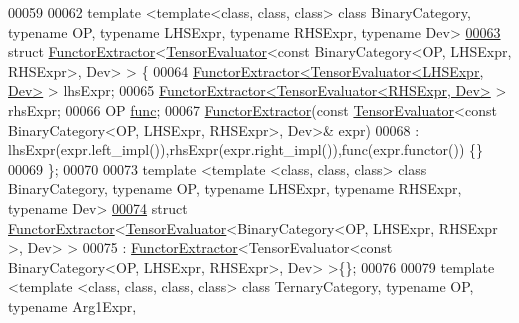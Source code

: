 \begin{DoxyCode}
00059 
00062 \textcolor{keyword}{template} <\textcolor{keyword}{template}<\textcolor{keyword}{class}, \textcolor{keyword}{class}, \textcolor{keyword}{class}> \textcolor{keyword}{class }BinaryCategory, \textcolor{keyword}{typename} OP, \textcolor{keyword}{typename} LHSExpr, \textcolor{keyword}{typename} 
      RHSExpr, \textcolor{keyword}{typename} Dev>
\hyperlink{struct_eigen_1_1_tensor_sycl_1_1internal_1_1_functor_extractor_3_01_tensor_evaluator_3_01const_08f8f7dde0ee1dac917205b74fcd4dba8}{00063} \textcolor{keyword}{struct }\hyperlink{struct_eigen_1_1_tensor_sycl_1_1internal_1_1_functor_extractor}{FunctorExtractor}<\hyperlink{struct_eigen_1_1_tensor_evaluator}{TensorEvaluator}<const BinaryCategory<OP, LHSExpr, 
      RHSExpr>, Dev> > \{
00064   \hyperlink{struct_eigen_1_1_tensor_sycl_1_1internal_1_1_functor_extractor}{FunctorExtractor<TensorEvaluator<LHSExpr, Dev>} > lhsExpr;
00065   \hyperlink{struct_eigen_1_1_tensor_sycl_1_1internal_1_1_functor_extractor}{FunctorExtractor<TensorEvaluator<RHSExpr, Dev>} > rhsExpr;
00066   OP \hyperlink{structfunc}{func};
00067   \hyperlink{struct_eigen_1_1_tensor_sycl_1_1internal_1_1_functor_extractor}{FunctorExtractor}(\textcolor{keyword}{const} \hyperlink{struct_eigen_1_1_tensor_evaluator}{TensorEvaluator}<\textcolor{keyword}{const} BinaryCategory<OP, LHSExpr,
       RHSExpr>, Dev>& expr)
00068   : lhsExpr(expr.left\_impl()),rhsExpr(expr.right\_impl()),func(expr.functor()) \{\}
00069 \};
00070 
00073 \textcolor{keyword}{template} <\textcolor{keyword}{template} <\textcolor{keyword}{class}, \textcolor{keyword}{class}, \textcolor{keyword}{class}> \textcolor{keyword}{class }BinaryCategory, \textcolor{keyword}{typename} OP, \textcolor{keyword}{typename} LHSExpr, \textcolor{keyword}{typename} 
      RHSExpr, \textcolor{keyword}{typename} Dev>
\hyperlink{struct_eigen_1_1_tensor_sycl_1_1internal_1_1_functor_extractor_3_01_tensor_evaluator_3_01_binary6aa809deae21a95a36f05183e3e880d1}{00074} \textcolor{keyword}{struct }\hyperlink{struct_eigen_1_1_tensor_sycl_1_1internal_1_1_functor_extractor}{FunctorExtractor}<\hyperlink{struct_eigen_1_1_tensor_evaluator}{TensorEvaluator}<BinaryCategory<OP,  LHSExpr, RHSExpr
      >, Dev> >
00075 : \hyperlink{struct_eigen_1_1_tensor_sycl_1_1internal_1_1_functor_extractor}{FunctorExtractor}<TensorEvaluator<const BinaryCategory<OP,  LHSExpr, RHSExpr>, Dev> >\{\};
00076 
00079 \textcolor{keyword}{template} <\textcolor{keyword}{template} <\textcolor{keyword}{class}, \textcolor{keyword}{class}, \textcolor{keyword}{class}, \textcolor{keyword}{class}> \textcolor{keyword}{class }TernaryCategory, \textcolor{keyword}{typename} OP, \textcolor{keyword}{typename} Arg1Expr, \textcolor{keyword}{
}
\end{DoxyCode}
